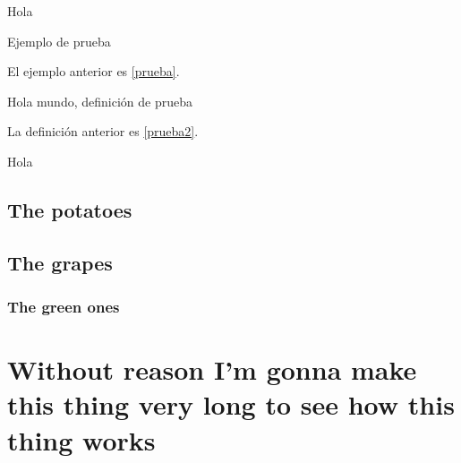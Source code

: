 \documentclass[draft]{qx-files/qx-book}
\begin{document}
\lipsum[1]

\begin{theorem}
  Hola
\end{theorem}



\lipsum[1]

\lipsum[1]

\begin{example}\label{prueba}
  Ejemplo de prueba
\end{example}

El ejemplo anterior es \ref{prueba}.

\lipsum[1]

\begin{definition}\label{prueba2}
  Hola mundo, definición de prueba
\end{definition}

La definición anterior es \ref{prueba2}.


\lipsum[1]


\begin{theorem}
  Hola
\end{theorem}



\lipsum[1]



\section{The potatoes}

\lipsum[1-10]



\lipsum[1-2]

\ExerciseSection

\lipsum[1]

\section{The grapes}

\lipsum[1]

\subsection{The green ones}

\lipsum[1]

\chapter*{Without reason I'm gonna make this thing very long to see how this thing works}
\end{document}
